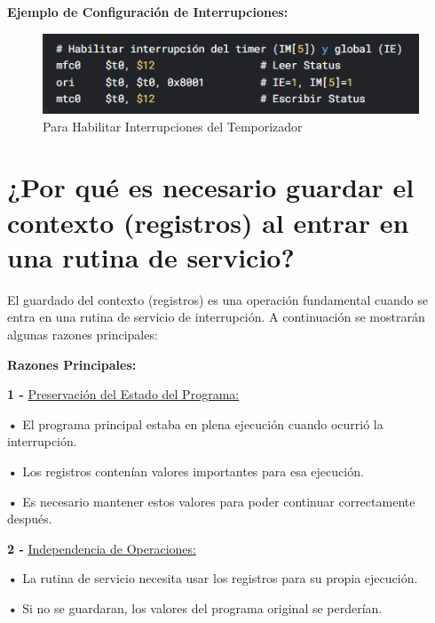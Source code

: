 \documentclass{article}
\begin{document}
\quad

\textbf{Ejemplo de Configuración de Interrupciones: }

\begin{figure}[h]
    \centering
    \includegraphics[width=10cm\textwidth]{figura_03_(practica04).png}
    \caption{Para Habilitar Interrupciones del Temporizador}
    \label{fig:img1}
\end{figure}


\quad
\newpage






\section{¿Por qué es necesario guardar el contexto (registros) al entrar en una rutina de servicio?}

\quad

{El guardado del contexto (registros) es una operación fundamental cuando se entra en una rutina de servicio de interrupción. A continuación se mostrarán algunas razones principales:}

\quad

\textbf{ Razones Principales: }

\quad

\textbf{1 -  } {\underline{Preservación del Estado del Programa: }}

\quad

\textbf{    •} { El programa principal estaba en plena ejecución cuando ocurrió la interrupción.}

\textbf{    •} { Los registros contenían valores importantes para esa ejecución.}

\textbf{    •} { Es necesario mantener estos valores para poder continuar correctamente después.}


\quad

\textbf{2 -  } {\underline{Independencia de Operaciones: }}

\quad

\textbf{    •} { La rutina de servicio necesita usar los registros para su propia ejecución.}

\textbf{    •} { Si no se guardaran, los valores del programa original se perderían.}
\end{document}
